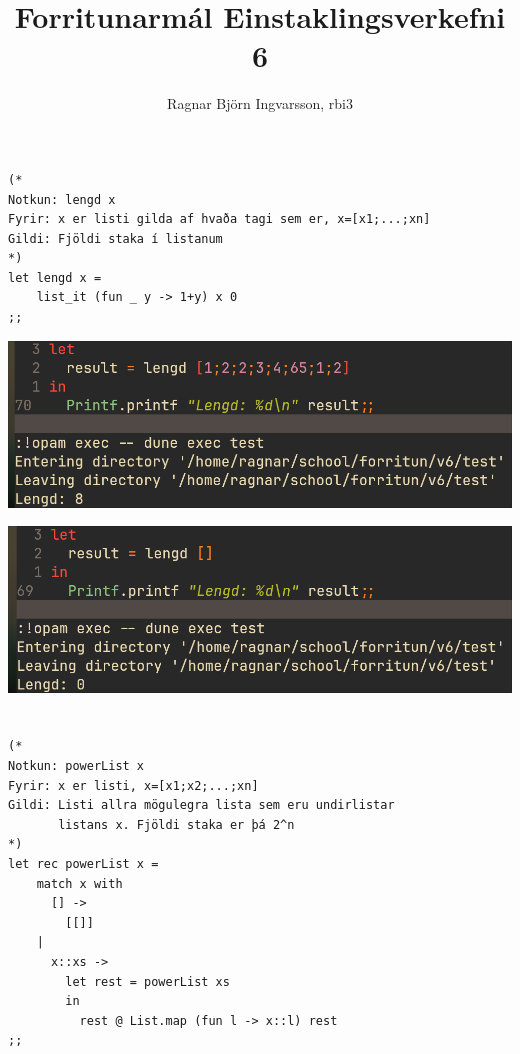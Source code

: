 \documentclass{article}
\title{Forritunarmál Einstaklingsverkefni 6}
\author{Ragnar Björn Ingvarsson, rbi3}
\begin{document}
\renewcommand\thepage{}
	
	\maketitle

	\newpage
	\setcounter{page}{1}
	\renewcommand\thepage{\arabic{page}}

	\section{}
	\begin{verbatim}
(*
Notkun: lengd x
Fyrir: x er listi gilda af hvaða tagi sem er, x=[x1;...;xn]
Gildi: Fjöldi staka í listanum
*)
let lengd x =
    list_it (fun _ y -> 1+y) x 0
;;
	\end{verbatim}
	\begin{center}
		\includegraphics[scale=0.35]{lengd.png}
	\end{center}
	\begin{center}
		\includegraphics[scale=0.35]{lengd2.png}
	\end{center}

	\newpage
	\section{}
	\begin{verbatim}
(*
Notkun: powerList x
Fyrir: x er listi, x=[x1;x2;...;xn]
Gildi: Listi allra mögulegra lista sem eru undirlistar
       listans x. Fjöldi staka er þá 2^n
*)
let rec powerList x =
    match x with
      [] -> 
        [[]]
    | 
      x::xs ->
        let rest = powerList xs
        in 
          rest @ List.map (fun l -> x::l) rest
;;
	\end{verbatim}
\end{document}

